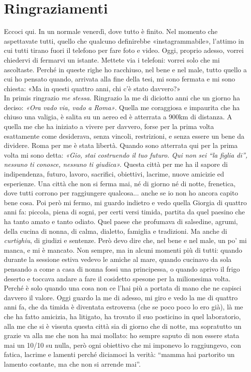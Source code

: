 \section*{Ringraziamenti} 
Eccoci qui. In un normale venerdì, dove tutto è finito. Nel momento che aspettavate tutti, quello che qualcuno definirebbe «instagrammabile», l'attimo in cui tutti tirano fuori il telefono per fare foto e video.
Oggi, proprio adesso, vorrei chiedervi di fermarvi un istante. Mettete via i telefoni: vorrei solo che mi ascoltaste. Perché in queste righe ho racchiuso, nel bene e nel male, tutto quello a cui ho pensato quando, arrivata alla fine della tesi, mi sono fermata e mi sono chiesta: «Ma in questi quattro anni, chi c'è stato davvero?»
\\
In primis ringrazio \textit{me stessa}. Ringrazio la me di diciotto anni che un giorno ha deciso: \textit{«Ora vado via, vado a Roma»}. Quella me coraggiosa e impaurita che ha chiuso una valigia, è salita su un aereo ed è atterrata a 900km di distanza. A quella me che ha iniziato a vivere per davvero, forse per la prima volta esattamente come desiderava, senza vincoli, restrizioni, e senza essere un bene da dividere.
Roma per me è stata libertà. Quando sono atterrata qui per la prima volta mi sono detta: \textit{«Gio, stai costruendo il tuo futuro. Qui non sei “la figlia di”, nessuno ti conosce, nessuno ti giudica».} Questa città per me ha il sapore di indipendenza, futuro, lavoro, sacrifici, obiettivi, lacrime, nuove amicizie ed esperienze. Una città che non si ferma mai, né di giorno né di notte, frenetica, dove tutti corrono per raggiungere qualcosa... anche se io non ho ancora capito bene cosa.
Poi però mi fermo, mi guardo indietro e vedo quella Giorgia di quattro anni fa: piccola, piena di sogni, per certi versi timida, partita da quel paesino che ha tanto amato e tanto odiato. Quel paese che profumava di salsedine, agrumi, della cucina di nonna, di calma, dialetto, famiglia e tradizioni. Ma anche di \textit{curtighiu}, di giudizi e sentenze.
Però devo dire che, nel bene e nel male, un po' mi manca, e mi è mancato.
Non sempre, ma in alcuni momenti più di tutti: quando durante la sessione estiva vedevo le amiche al mare, quando cucinavo da sola pensando a come a casa di nonna fossi una principessa, o quando aprivo il frigo deserto e toccava andare a fare il cosidetto spesone per la milionesima volta.
Perché è solo quando una cosa non ce l'hai più a portata di mano che ne capisci davvero il valore. 
Oggi guardo la me di adesso, mi giro e vedo la me di quattro anni fa, che da timida è diventata estroversa (che se poco poco lo ero già), là me che ha fatto amicizia, ha litigato, ha trovato il suo posticino in quel laboratorio, alla me che si è vissuta questa città sia di giorno che di notte, ma sopratutto un grazie va alla me che non ha mai mollato: ho sempre saputo di non essere stata mai un 10/10 su nulla, però ogni obiettivo che mi imponevo lo raggiungevo, con fatica, lacrime e lamenti perché diciamoci la verità: “mamma hai partorito un lamento costante, ma che non si arrende mai”.
